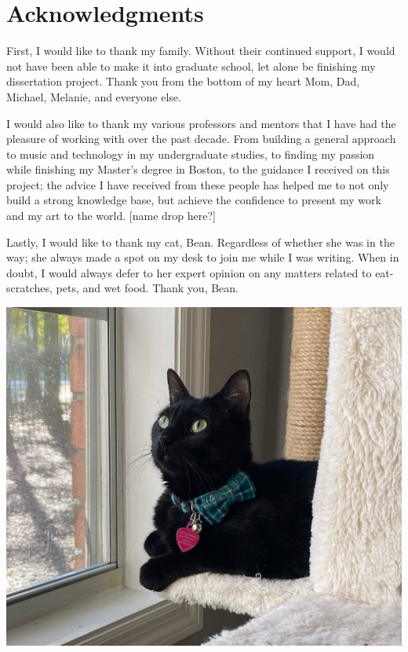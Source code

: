 

\chapter{Acknowledgments}

First, I would like to thank my family. Without their continued support, I would not have been able to make it into graduate school, let alone be finishing my dissertation project. Thank you from the bottom of my heart Mom, Dad, Michael, Melanie, and everyone else. 

I would also like to thank my various professors and mentors that I have had the pleasure of working with over the past decade. From building a general approach to music and technology in my undergraduate studies, to finding my passion while finishing my Master’s degree in Boston, to the guidance I received on this project; the advice I have received from these people has helped me to not only build a strong knowledge base, but achieve the confidence to present my work and my art to the world. [name drop here?]

Lastly, I would like to thank my cat, Bean. Regardless of whether she was in the way; she always made a spot on my desk to join me while I was writing. When in doubt, I would always defer to her expert opinion on any matters related to eat-scratches, pets, and wet food. Thank you, Bean.

\vspace{10mm}

\begin{center}
    \includegraphics[scale=0.12]{bean.jpeg}
\end{center}




